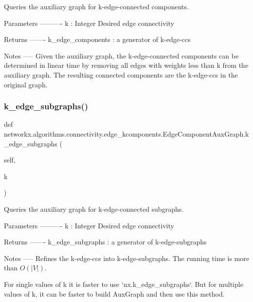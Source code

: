 \begin{DoxyVerb}Queries the auxiliary graph for k-edge-connected components.

Parameters
----------
k : Integer
    Desired edge connectivity

Returns
-------
k_edge_components : a generator of k-edge-ccs

Notes
-----
Given the auxiliary graph, the k-edge-connected components can be
determined in linear time by removing all edges with weights less than
k from the auxiliary graph.  The resulting connected components are the
k-edge-ccs in the original graph.
\end{DoxyVerb}
 \mbox{\label{classnetworkx_1_1algorithms_1_1connectivity_1_1edge__kcomponents_1_1EdgeComponentAuxGraph_af05d806dd8d485ce8980d532c7b4d3d8}} 
\subsubsection{\texorpdfstring{k\+\_\+edge\+\_\+subgraphs()}{k\_edge\_subgraphs()}}
{\footnotesize\ttfamily def networkx.\+algorithms.\+connectivity.\+edge\+\_\+kcomponents.\+Edge\+Component\+Aux\+Graph.\+k\+\_\+edge\+\_\+subgraphs (\begin{DoxyParamCaption}\item[{}]{self,  }\item[{}]{k }\end{DoxyParamCaption})}

\begin{DoxyVerb}Queries the auxiliary graph for k-edge-connected subgraphs.

Parameters
----------
k : Integer
    Desired edge connectivity

Returns
-------
k_edge_subgraphs : a generator of k-edge-subgraphs

Notes
-----
Refines the k-edge-ccs into k-edge-subgraphs. The running time is more
than $O(|V|)$.

For single values of k it is faster to use `nx.k_edge_subgraphs`.
But for multiple values of k, it can be faster to build AuxGraph and
then use this method.
\end{DoxyVerb}
 

